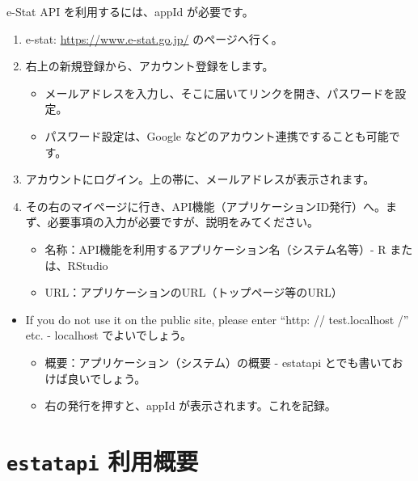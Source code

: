 \documentclass[
  xelatex, ja=standard]{bxjsbook}
\providecommand{\tightlist}{%
  \setlength{\itemsep}{0pt}\setlength{\parskip}{0pt}}
\theoremstyle{definition}
\theoremstyle{definition}
\theoremstyle{definition}
\theoremstyle{definition}
\theoremstyle{remark}
\begin{document}
e-Stat API を利用するには、appId が必要です。

\begin{enumerate}
\def\labelenumi{\arabic{enumi}.}
\tightlist
\item
  e-stat: \url{https://www.e-stat.go.jp/} のページへ行く。
\item
  右上の新規登録から、アカウント登録をします。

  \begin{itemize}
  \tightlist
  \item
    メールアドレスを入力し、そこに届いてリンクを開き、パスワードを設定。
  \item
    パスワード設定は、Google などのアカウント連携ですることも可能です。
  \end{itemize}
\item
  アカウントにログイン。上の帯に、メールアドレスが表示されます。
\item
  その右のマイページに行き、API機能（アプリケーションID発行）へ。まず、必要事項の入力が必要ですが、説明をみてください。

  \begin{itemize}
  \tightlist
  \item
    名称：API機能を利用するアプリケーション名（システム名等）- R または、RStudio
  \item
    URL：アプリケーションのURL（トップページ等のURL）
  \end{itemize}
\end{enumerate}

\begin{itemize}
\tightlist
\item
  If you do not use it on the public site, please enter ``http: // test.localhost /'' etc. - localhost でよいでしょう。

  \begin{itemize}
  \tightlist
  \item
    概要：アプリケーション（システム）の概要 - estatapi とでも書いておけば良いでしょう。
  \item
    右の発行を押すと、appId が表示されます。これを記録。
  \end{itemize}
\end{itemize}

\hypertarget{estatapi-ux5229ux7528ux6982ux8981-1}{%
\section{\texorpdfstring{\texttt{estatapi} 利用概要}{estatapi 利用概要}}\label{estatapi-ux5229ux7528ux6982ux8981-1}}
\end{document}
